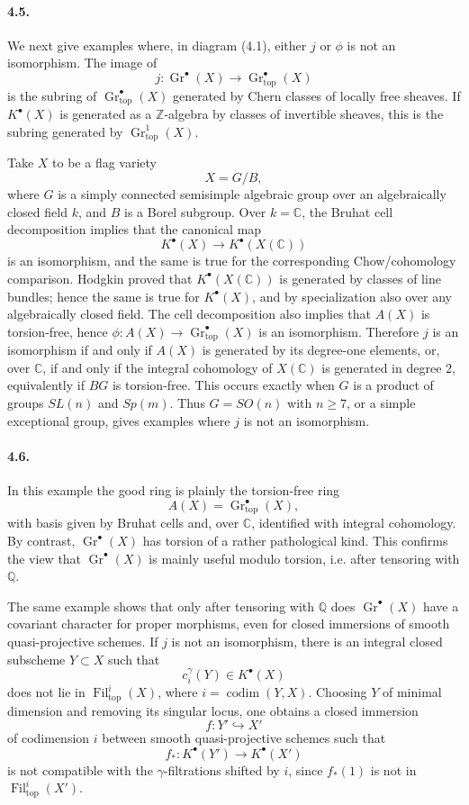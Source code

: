 \documentclass[12pt]{article}
\newcommand{\ZZ}{\mathbb Z}
\newcommand{\QQ}{\mathbb Q}
\newcommand{\CC}{\mathbb C}
\newcommand{\Gr}{\operatorname{Gr}}
\newcommand{\Fil}{\operatorname{Fil}}
\newcommand{\codim}{\operatorname{codim}}
\newcommand{\longto}{\longrightarrow}
\newcommand{\topf}{\mathrm{top}}
\begin{document}
\paragraph{4.5.}
We next give examples where, in diagram (4.1), either $j$ or $\phi$ is not an isomorphism. The image of
\[
j:\Gr^\bullet(X)\to\Gr^\bullet_{\topf}(X)
\]
is the subring of $\Gr^\bullet_{\topf}(X)$ generated by Chern classes of locally free sheaves. If $K^\bullet(X)$ is generated as a $\ZZ$-algebra by classes of invertible sheaves, this is the subring generated by $\Gr^1_{\topf}(X)$.

Take $X$ to be a flag variety
\[
X=G/B,
\]
where $G$ is a simply connected semisimple algebraic group over an algebraically closed field $k$, and $B$ is a Borel subgroup. Over $k=\CC$, the Bruhat cell decomposition implies that the canonical map
\[
K^\bullet(X)\longto K^\bullet(X(\CC))
\]
is an isomorphism, and the same is true for the corresponding Chow/cohomology comparison. Hodgkin proved that $K^\bullet(X(\CC))$ is generated by classes of line bundles; hence the same is true for $K^\bullet(X)$, and by specialization also over any algebraically closed field. The cell decomposition also implies that $A(X)$ is torsion-free, hence $\phi:A(X)\to\Gr^\bullet_{\topf}(X)$ is an isomorphism. Therefore $j$ is an isomorphism if and only if $A(X)$ is generated by its degree-one elements, or, over $\CC$, if and only if the integral cohomology of $X(\CC)$ is generated in degree $2$, equivalently if $BG$ is torsion-free. This occurs exactly when $G$ is a product of groups $SL(n)$ and $Sp(m)$. Thus $G=SO(n)$ with $n\geq7$, or a simple exceptional group, gives examples where $j$ is not an isomorphism.

\paragraph{4.6.}
In this example the good ring is plainly the torsion-free ring
\[
A(X)=\Gr^\bullet_{\topf}(X),
\]
with basis given by Bruhat cells and, over $\CC$, identified with integral cohomology. By contrast, $\Gr^\bullet(X)$ has torsion of a rather pathological kind. This confirms the view that $\Gr^\bullet(X)$ is mainly useful modulo torsion, i.e. after tensoring with $\QQ$.

The same example shows that only after tensoring with $\QQ$ does $\Gr^\bullet(X)$ have a covariant character for proper morphisms, even for closed immersions of smooth quasi-projective schemes. If $j$ is not an isomorphism, there is an integral closed subscheme $Y\subset X$ such that
\[
c_i^\gamma(Y)\in K^\bullet(X)
\]
does not lie in $\Fil^i_{\topf}(X)$, where $i=\codim(Y,X)$. Choosing $Y$ of minimal dimension and removing its singular locus, one obtains a closed immersion
\[
f:Y'\hookrightarrow X'
\]
of codimension $i$ between smooth quasi-projective schemes such that
\[
f_*:K^\bullet(Y')\to K^\bullet(X')
\]
is not compatible with the $\gamma$-filtrations shifted by $i$, since $f_*(1)$ is not in $\Fil^i_{\topf}(X')$.
\end{document}
